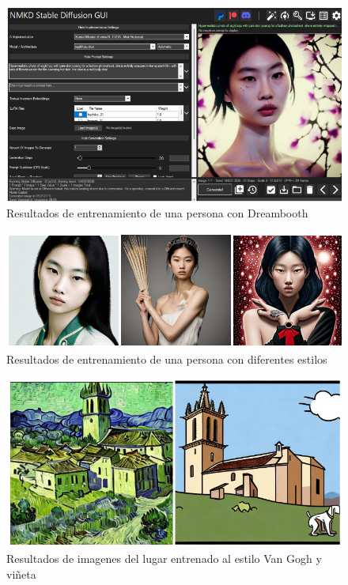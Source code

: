 \begin{figure}[!htb]
	\centering
	\includegraphics[width = 1
	\textwidth]{Imagenes/Vectorial/hoyeon1.png}
	\caption{Resultados de entrenamiento de una persona con Dreambooth}
	\label{fig:hoyeonsd}
\end{figure}

\begin{figure}[!htb]
	\centering
	\includegraphics[width = 1
	\textwidth]{Imagenes/Vectorial/hoyeon_results.png}
	\caption{Resultados de entrenamiento de una persona con diferentes estilos}
	\label{fig:imagshoyeon}
\end{figure}


\begin{figure}[!htb]
	\centering
	\includegraphics[width = 1
	\textwidth]{Imagenes/Vectorial/colmenar_styles.png}
	\caption{Resultados de imagenes del lugar entrenado al estilo Van Gogh y viñeta}
	\label{fig:colmestyles}
\end{figure}



